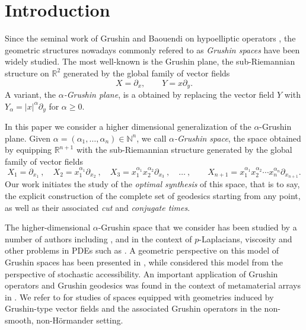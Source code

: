 \documentclass[12pt]{amsart}
\numberwithin{equation}{section}
\theoremstyle{plain}
\theoremstyle{definition}
\theoremstyle{remark}
\begin{document}
\maketitle


\tableofcontents


\section{Introduction}
Since the seminal work of Grushin and Baouendi on hypoelliptic operators \cite{Grushin1970,Baouendi1967}, the geometric structures nowadays commonly refered to as \emph{Grushin spaces} have been widely studied. The most well-known is the Grushin plane, the sub-Riemannian structure on $\mathbb{R}^2$ generated by the global family of vector fields
\[
    X = \partial_x, \qquad Y = x \partial_y.
\]
A variant, the \emph{$\alpha$-Grushin plane}, is a obtained by replacing the vector field $Y$ with $Y_\alpha = |x|^\alpha \partial_y$ for $\alpha\geq 0$.

In this paper we consider a higher dimensional generalization of the $\alpha$-Grushin plane. Given $\alpha = (\alpha_1, \dots, \alpha_n) \in \mathbb{N}^{n}$, we call \emph{$\alpha$-Grushin space}, the space obtained by equipping $\mathbb{R}^{n + 1}$ with the sub-Riemannian structure generated by the global family of vector fields
\[
    X_1 = \partial_{x_1} \ , \quad X_2 = x_1^{\alpha_1} \partial_{x_2} \ , \quad X_3 = x_1^{\alpha_1} x_2^{\alpha_2} \partial_{x_3} \ , \quad \dots \ , \qquad X_{n + 1} = x_1^{\alpha_1} x_2^{\alpha_2} \cdots x_n^{\alpha_n} \partial_{x_{n+1}}.
\]
Our work initiates the study of the \emph{optimal synthesis} of this space, that is to say, the explicit construction of the complete set of geodesics starting from any point, as well as their associated \emph{cut} and \emph{conjugate times}.

The higher-dimensional $\alpha$-Grushin space that we consider has been studied by a number of authors including \cite{FerrariFranchi2000}, and in the context of $p$-Laplacians, viscosity and other problems in PDEs such as \cite{Bieske2005LipschitzEO, BieskeGong2006}. A geometric perspective on this model of Grushin spaces has been presented in \cite{WuJang-Mei2015}, while \cite{TurcanuUdriste2017} considered this model from the perspective of stochastic accessibility. An important application of Grushin operators and Grushin geodesics was found in the context of metamaterial arrays in \cite{GreenleafKettunenKurylevLassasUhlmann2018}. We refer to \cite{BarilariBoscainNeel2012, BoscainPrandi2016, BoscainNeel2020, BorzaPhDThesis2021, WuJang-Mei2015, KogojLanconelli2012} for studies of spaces equipped with geometries induced by Grushin-type vector fields and the associated Grushin operators in the non-smooth, non-H\"{o}rmander setting.
\end{document}
